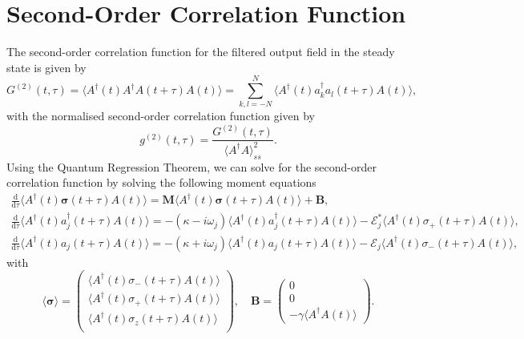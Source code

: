 \documentclass{article}
\newcommand{\ddtau}[1][]{\frac{\mathrm{d} #1}{\mathrm{d}\tau}}
\begin{document}
\section{Second-Order Correlation Function}

The second-order correlation function for the filtered output field in the steady state is given by
\begin{equation}
	G^{(2)}(t, \tau) = \langle A^{\dagger}(t) A^{\dagger} A(t + \tau) A(t) \rangle = \sum_{k,l=-N}^{N} \langle A^{\dagger}(t) a^{\dagger}_{k} a_{l} (t + \tau) A(t) \rangle,
\end{equation}
with the normalised second-order correlation function given by
\begin{equation}
	g^{(2)}(t, \tau) = \frac{G^{(2)}(t, \tau)}{\langle A^{\dagger} A \rangle_{ss}^{2}}.
\end{equation}
Using the Quantum Regression Theorem, we can solve for the second-order correlation function by solving the following moment equations
\begin{subequations}
	\begin{gather}
		\ddtau \langle A^{\dagger}(t) \bm{\sigma}(t + \tau) A(t) \rangle = \bm{M} \langle A^{\dagger}(t) \bm{\sigma}(t + \tau) A(t) \rangle + \bm{B}, \\
		\ddtau \langle A^{\dagger}(t) a^{\dagger}_{j}(t + \tau) A(t) \rangle = -\left( \kappa - i \omega_{j} \right) \langle A^{\dagger}(t) a^{\dagger}_{j}(t + \tau) A(t) \rangle - \mathcal{E}_{j}^{*} \langle A^{\dagger}(t) \sigma_{+}(t + \tau) A(t) \rangle, \\
		\ddtau \langle A^{\dagger}(t) a_{j}(t + \tau) A(t) \rangle = -\left( \kappa + i \omega_{j} \right) \langle A^{\dagger}(t) a_{j}(t + \tau) A(t) \rangle - \mathcal{E}_{j} \langle A^{\dagger}(t) \sigma_{-}(t + \tau) A(t) \rangle,
	\end{gather}
\end{subequations}
with
\begin{equation}
	\langle \bm{\sigma} \rangle =
	\begin{pmatrix}
		\langle A^{\dagger}(t) \sigma_{-}(t + \tau) A(t) \rangle \\
		\langle A^{\dagger}(t) \sigma_{+}(t + \tau) A(t) \rangle \\
		\langle A^{\dagger}(t) \sigma_{z}(t + \tau) A(t) \rangle \\
	\end{pmatrix}, \quad \bm{B} =
	\begin{pmatrix}
		0 \\
		0 \\
		-\gamma \langle A^{\dagger} A(t) \rangle
	\end{pmatrix}.
\end{equation}
\end{document}
